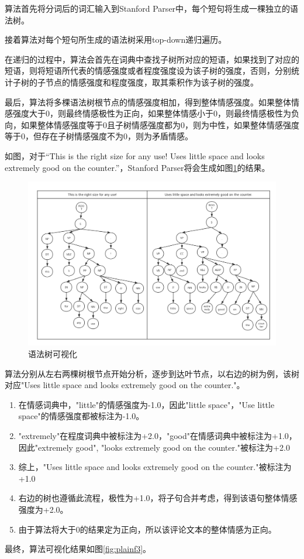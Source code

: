 算法首先将分词后的词汇输入到Stanford Parser中，每个短句将生成一棵独立的语法树。


接着算法对每个短句所生成的语法树采用top-down递归遍历。


在递归的过程中，算法会首先在词典中查找子树所对应的短语，如果找到了对应的短语，则将短语所代表的情感强度或者程度强度设为该子树的强度，否则，分别统计子树的子节点的情感强度和程度强度，取其乘积作为该子树的强度。


最后，算法将多棵语法树根节点的情感强度相加，得到整体情感强度。如果整体情感强度大于0，则最终情感极性为正向，如果整体情感小于0，则最终情感极性为负向，如果整体情感强度等于0且子树情感强度都为0，则为中性，如果整体情感强度等于0，但存在子树情感强度不为0，则为矛盾情感。


如图，对于“This is the right size for any use!  Uses little space and looks extremely good on the counter.”，Stanford Parser将会生成如图\ref{fig:plainf2}的结果。

\begin{figure}
\begin{center}
\includegraphics[width=\textwidth]{graphic/plainmodel2.png}
\caption{语法树可视化 \label{fig:plainf2}}
\end{center}
\end{figure}


算法分别从左右两棵树根节点开始分析，逐步到达叶节点，以右边的树为例，该树对应"Uses little space and looks extremely good on the counter."。\par
\begin{enumerate}
\item 在情感词典中，"little"的情感强度为-1.0，因此"little space"，"Use little space"的情感强度都被标注为-1.0。
\item "extremely"在程度词典中被标注为+2.0，"good"在情感词典中被标注为+1.0，因此"extremely good", "looks extremely good on the counter."被标注为+2.0
\item 综上，"Uses little space and looks extremely good on the counter."被标注为+1.0
\item 右边的树也遵循此流程，极性为+1.0，将子句合并考虑，得到该语句整体情感强度为+2.0。
\item 由于算法将大于0的结果定为正向，所以该评论文本的整体情感为正向。
\end{enumerate}\par
最终，算法可视化结果如图\ref{fig:plainf3}。


